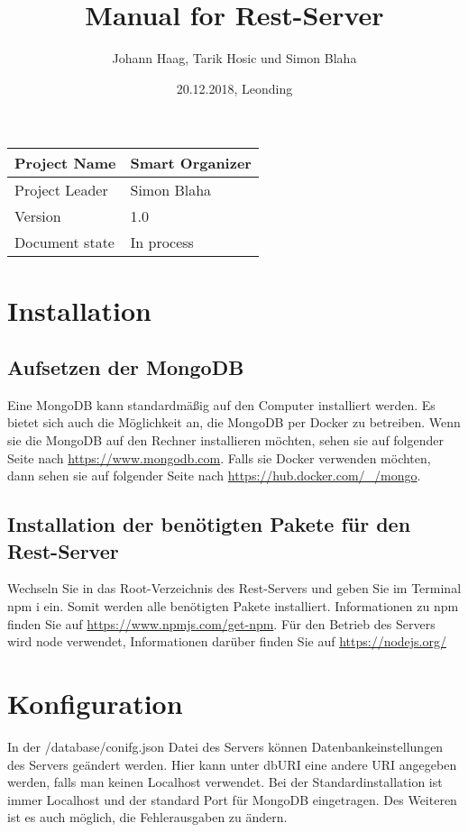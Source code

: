 \documentclass[12pt]{scrartcl}
\title{Manual for Rest-Server}
\author{Johann Haag, Tarik Hosic und Simon Blaha}
\date{20.12.2018, Leonding}
\begin{document}
    \maketitle
    \begin{flushleft}
    \begin{tabular}{|l|l|}
    \hline
    Project Name & Smart Organizer \\ \hline
    Project Leader & Simon Blaha \\ \hline
    Version & 1.0\\ \hline
    Document state & In process \\ \hline
    \end{tabular}
    \end{flushleft}

    \pagebreak
    \tableofcontents
    \pagebreak

    \section{Installation}
    \subsection{Aufsetzen der MongoDB}
        Eine MongoDB kann standardmäßig auf den Computer installiert werden. Es bietet sich auch die Möglichkeit an, die MongoDB per Docker zu betreiben.
        Wenn sie die MongoDB auf den Rechner installieren möchten, sehen sie auf folgender Seite nach \url{https://www.mongodb.com}.
        Falls sie Docker verwenden möchten, dann sehen sie auf folgender Seite nach \url{https://hub.docker.com/_/mongo}.

    \subsection{Installation der benötigten Pakete für den Rest-Server}
        Wechseln Sie in das Root-Verzeichnis des Rest-Servers und geben Sie im Terminal npm i ein.
        Somit werden alle benötigten Pakete installiert.
        Informationen zu npm finden Sie auf \url{https://www.npmjs.com/get-npm}.
        Für den Betrieb des Servers wird node verwendet, Informationen darüber finden Sie auf \url{https://nodejs.org/}

    \section{Konfiguration}
        In der /database/conifg.json Datei des Servers können Datenbankeinstellungen des Servers geändert werden.
        Hier kann unter dbURI eine andere URI angegeben werden, falls man keinen Localhost verwendet.
        Bei der Standardinstallation ist immer Localhost und der standard Port für MongoDB eingetragen.
        Des Weiteren ist es auch möglich, die Fehlerausgaben zu ändern.
\end{document}
